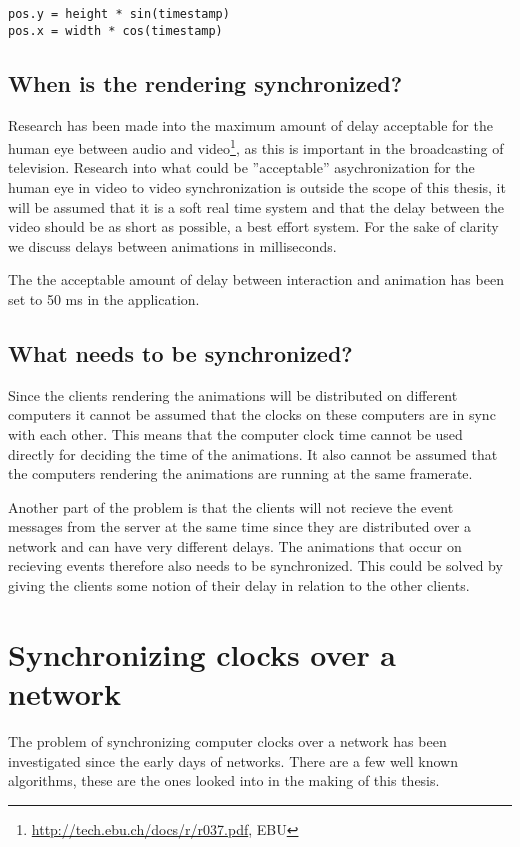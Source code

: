 \begin{verbatim}
pos.y = height * sin(timestamp)
pos.x = width * cos(timestamp)
\end{verbatim}

\subsection{When is the rendering synchronized?}

Research has been made into the maximum amount of delay acceptable for the human eye between audio and video\footnote{\url{http://tech.ebu.ch/docs/r/r037.pdf}, EBU}, as this is important in the broadcasting of television. Research into what could be ''acceptable'' asychronization for the human eye in video to video synchronization is outside the scope of this thesis, it will be assumed that it is a soft real time system and that the delay between the video should be as short as possible, a best effort system. For the sake of clarity we discuss delays between animations in milliseconds.

The the acceptable amount of delay between interaction and animation has been set to 50 ms in the application.  

\subsection{What needs to be synchronized?}

Since the clients rendering the animations will be distributed on different computers it cannot be assumed that the clocks on these computers are in sync with each other. This means that the computer clock time cannot be used directly for deciding the time of the animations. It also cannot be assumed that the computers rendering the animations are running at the same framerate. 

Another part of the problem is that the clients will not recieve the event messages from the server at the same time since they are distributed over a network and can have very different delays. The animations that occur on recieving events therefore also needs to be synchronized. This could be solved by giving the clients some notion of their delay in relation to the other clients. 

\section{Synchronizing clocks over a network}
The problem of synchronizing computer clocks over a network has been investigated since the early days of networks. There are a few well known algorithms, these are the ones looked into in the making of this thesis. 





